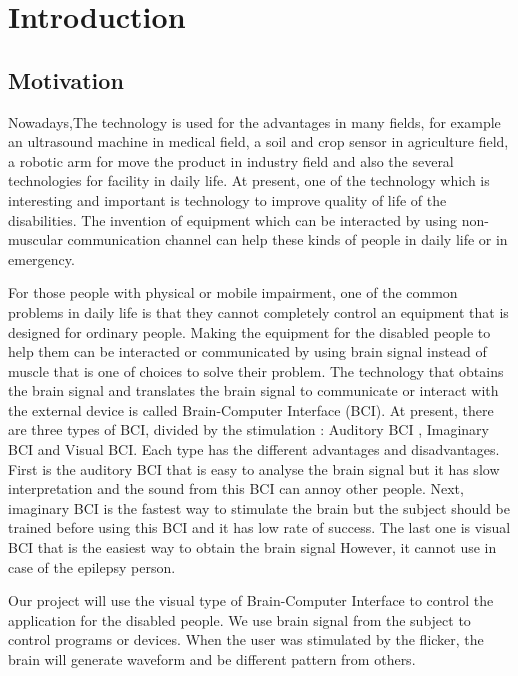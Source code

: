 \chapter{Introduction}

\setlength{\parindent}{4em}
\setlength{\parskip}{1em}
\renewcommand{\baselinestretch}{1.5}
\section{Motivation}

\hspace{1.5cm}Nowadays,The technology is used for the advantages in many fields, for example an ultrasound machine in medical field, a soil and crop sensor in agriculture field, a robotic arm for move the product in industry field and also the several technologies for facility in daily life. At present, one of the technology which is interesting and important is technology to improve quality of life of the disabilities. The invention of equipment which can be interacted by using non-muscular communication channel can help these kinds of people in daily life or in emergency.\par  
For those people with physical or mobile impairment, one of the common problems in daily life is that they  cannot completely control an equipment that is designed for ordinary people. Making the equipment for the disabled people to help them can be interacted or communicated by using brain signal instead of muscle that is one of choices to solve their problem. The technology that obtains the brain signal and translates the brain signal to communicate or interact with the external device is called Brain-Computer Interface (BCI). At present, there are three types of BCI, divided by the stimulation : Auditory BCI , Imaginary BCI and Visual BCI. Each type has the different advantages and disadvantages. First is the auditory BCI that is easy to analyse the brain signal but it has slow interpretation and the sound from this BCI can annoy other people. Next, imaginary BCI is the fastest way to stimulate the brain but the subject should be trained before using this BCI and it has low rate of success. The last one is visual BCI that is the easiest way to obtain the brain signal However, it cannot use in case of the epilepsy person.\par
Our project will use the visual type of Brain-Computer Interface to control the application for the disabled people. We use brain signal from the subject to control programs or devices. When the user was stimulated by the flicker, the brain will generate waveform and be different pattern from others. 

